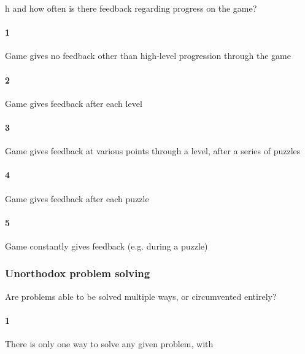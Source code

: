 h and how often is there feedback regarding progress on the game?\paragraph{1}Game gives no feedback other than high-level progression through the game\paragraph{2}Game gives feedback after each level\paragraph{3}Game gives feedback at various points through a level, after a series of puzzles\paragraph{4}Game gives feedback after each puzzle\paragraph{5}Game constantly gives feedback (e.g. during a puzzle)\subsubsection{Unorthodox problem solving}Are problems able to be solved multiple ways, or circumvented entirely?\paragraph{1}There is only one way to solve any given problem, with 